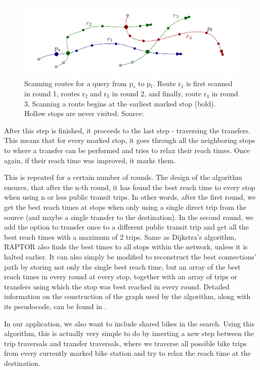 \begin{figure}[h!]
    \centering
    \includegraphics[width=\textwidth]{img/raptor_illustration.png}
    \caption[RAPTOR algorithm illustration]{Scanning routes for a query from p$_s$ to p$_t$. Route r$_1$ is first scanned in round 1, routes r$_2$ and r$_3$ in round 2, and finally, route r$_4$ in round 3. Scanning a route begins at the earliest marked stop (bold). Hollow stops are never visited. Source: \textcite{delling2015raptor}}
    \label{fig:gtfs_scheme}
\end{figure}


After this step is finished, it proceeds to the last step - traversing the transfers. This means that for every marked stop, it goes through all the neighboring stops to where a transfer can be performed and tries to relax their reach times. Once again, if their reach time was improved, it marks them.


This is repeated for a certain number of rounds. The design of the algorithm ensures, that after the n-th round, it has found the best reach time to every stop when using n or less public transit trips. In other words, after the first round, we get the best reach times at stops when only using a single direct trip from the source (and maybe a single transfer to the destination). In the second round, we add the option to transfer once to a different public transit trip and get all the best reach times with a maximum of 2 trips. Same as Dijkstra's algorithm, RAPTOR also finds the best times to all stops within the network, unless it is halted earlier. It can also simply be modified to reconstruct the best connections' path by storing not only the single best reach time, but an array of the best reach times in every round at every stop, together with an array of trips or transfers using which the stop was best reached in every round. Detailed information on the construction of the graph used by the algorithm, along with its pseudocode, can be found in \textcite{delling2015raptor}. 

In our application, we also want to include shared bikes in the search. Using this algorithm, this is actually very simple to do by inserting a new step between the trip traversals and transfer traversals, where we traverse all possible bike trips from every currently marked bike station and try to relax the reach time at the destination.

